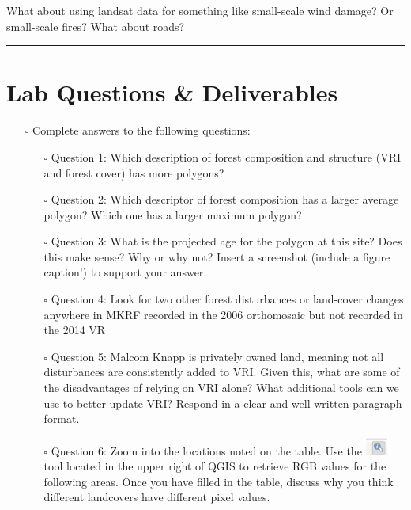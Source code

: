 \documentclass[
  letterpaper,
]{book}
\begin{document}
What about using landsat data for something like small-scale wind
damage? Or small-scale fires? What about roads?

\begin{center}\rule{0.5\linewidth}{0.5pt}\end{center}

\hypertarget{lab-questions-deliverables-1}{%
\section*{Lab Questions \&
Deliverables}\label{lab-questions-deliverables-1}}


\begin{itemize}
\item[$\square$]
  Complete answers to the following questions:

  \begin{itemize}
  \item[$\square$]
    Question 1: Which description of forest composition and structure
    (VRI and forest cover) has more polygons?
  \item[$\square$]
    Question 2: Which descriptor of forest composition has a larger
    average polygon? Which one has a larger maximum polygon?
  \item[$\square$]
    Question 3: What is the projected age for the polygon at this site?
    Does this make sense? Why or why not? Insert a screenshot (include a
    figure caption!) to support your answer.
  \item[$\square$]
    Question 4: Look for two other forest disturbances or land-cover
    changes anywhere in MKRF recorded in the 2006 orthomosaic but not
    recorded in the 2014 VR
  \item[$\square$]
    Question 5: Malcom Knapp is privately owned land, meaning not all
    disturbances are consistently added to VRI. Given this, what are
    some of the disadvantages of relying on VRI alone? What additional
    tools can we use to better update VRI? Respond in a clear and well
    written paragraph format.
  \item[$\square$]
    Question 6: Zoom into the locations noted on the table. Use the
    \includegraphics[width=0.28125in,height=\textheight]{images/clipboard-1450729439.png}
    tool located in the upper right of QGIS to retrieve RGB values for
    the following areas. Once you have filled in the table, discuss why
    you think different landcovers have different pixel values.


\end{itemize}
\end{itemize}
\end{document}
